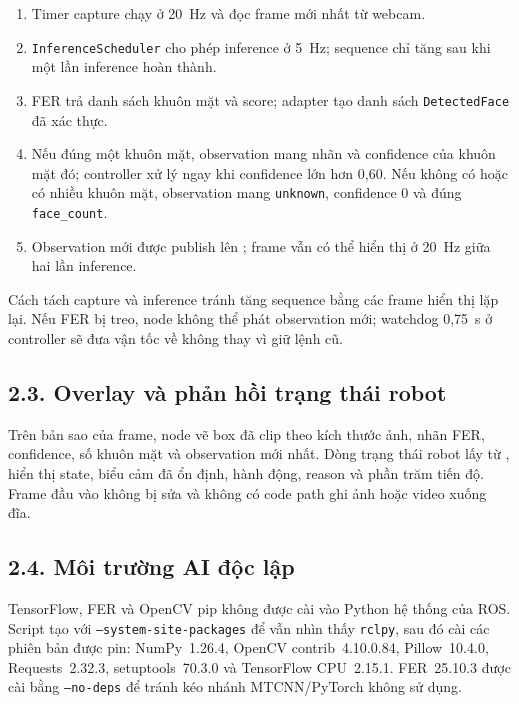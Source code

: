 \begin{enumerate}[leftmargin=1cm,itemsep=0.2em]
  \item Timer capture chạy ở 20~Hz và đọc frame mới nhất từ webcam.
  \item \texttt{InferenceScheduler} cho phép inference ở 5~Hz; sequence chỉ
        tăng sau khi một lần inference hoàn thành.
  \item FER trả danh sách khuôn mặt và score; adapter tạo danh sách
        \texttt{DetectedFace} đã xác thực.
  \item Nếu đúng một khuôn mặt, observation mang nhãn và confidence của khuôn
        mặt đó; controller xử lý ngay khi confidence lớn hơn 0,60. Nếu không
        có hoặc có nhiều khuôn mặt, observation mang
        \texttt{unknown}, confidence 0 và đúng \texttt{face\_count}.
  \item Observation mới được publish lên ; frame
        vẫn có thể hiển thị ở 20~Hz giữa hai lần inference.
\end{enumerate}

Cách tách capture và inference tránh tăng sequence bằng các frame hiển thị lặp
lại. Nếu FER bị treo, node không thể phát observation mới; watchdog 0,75~s ở
controller sẽ đưa vận tốc về không thay vì giữ lệnh cũ.

\subsection*{2.3. Overlay và phản hồi trạng thái robot}

Trên bản sao của frame, node vẽ box đã clip theo kích thước ảnh, nhãn FER,
confidence, số khuôn mặt và observation mới nhất. Dòng trạng thái robot lấy từ
, hiển thị state, biểu cảm đã ổn định, hành động,
reason và phần trăm tiến độ. Frame đầu vào không bị sửa và không có code path
ghi ảnh hoặc video xuống đĩa.

\subsection*{2.4. Môi trường AI độc lập}

TensorFlow, FER và OpenCV pip không được cài vào Python hệ thống của ROS.
Script  tạo  với
\texttt{--system-site-packages} để vẫn nhìn thấy \texttt{rclpy}, sau đó cài
các phiên bản được pin: NumPy~1.26.4, OpenCV contrib~4.10.0.84,
Pillow~10.4.0, Requests~2.32.3, setuptools~70.3.0 và
TensorFlow CPU~2.15.1. FER~25.10.3 được cài bằng \texttt{--no-deps} để tránh
kéo nhánh MTCNN/PyTorch không sử dụng.

